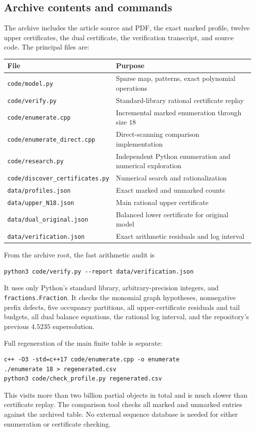 \documentclass[11pt,a4paper]{article}
\theoremstyle{definition}
\theoremstyle{remark}
\begin{document}
\subsection{Archive contents and commands}
The archive includes the article source and PDF, the exact marked profile,
twelve upper certificates, the dual certificate, the verification transcript,
and source code. The principal files are:
\begin{center}\small
\begin{tabular}{@{}ll@{}}
\toprule
File & Purpose\\
\midrule
\texttt{code/model.py} & Sparse map, patterns, exact polynomial operations\\
\texttt{code/verify.py} & Standard-library rational certificate replay\\
\texttt{code/enumerate.cpp} & Incremental marked enumeration through size $18$\\
\texttt{code/enumerate\_direct.cpp} & Direct-scanning comparison implementation\\
\texttt{code/research.py} & Independent Python enumeration and numerical exploration\\
\texttt{code/discover\_certificates.py} & Numerical search and rationalization\\
\texttt{data/profiles.json} & Exact marked and unmarked counts\\
\texttt{data/upper\_N18.json} & Main rational upper certificate\\
\texttt{data/dual\_original.json} & Balanced lower certificate for original model\\
\texttt{data/verification.json} & Exact arithmetic residuals and log interval\\
\bottomrule
\end{tabular}
\end{center}

From the archive root, the fast arithmetic audit is
\begin{lstlisting}
python3 code/verify.py --report data/verification.json
\end{lstlisting}
It uses only Python's standard library, arbitrary-precision integers, and
\texttt{fractions.Fraction}. It checks the monomial graph hypotheses,
nonnegative prefix defects, five occupancy partitions, all upper-certificate
residuals and tail budgets, all dual balance equations, the rational log
interval, and the repository's previous $4.5235$ supersolution.

Full regeneration of the main finite table is separate:
\begin{lstlisting}
c++ -O3 -std=c++17 code/enumerate.cpp -o enumerate
./enumerate 18 > regenerated.csv
python3 code/check_profile.py regenerated.csv
\end{lstlisting}
This visits more than two billion partial objects in total and is much slower
than certificate replay. The comparison tool checks all marked and unmarked
entries against the archived table. No external sequence database is needed
for either enumeration or certificate checking.
\end{document}

